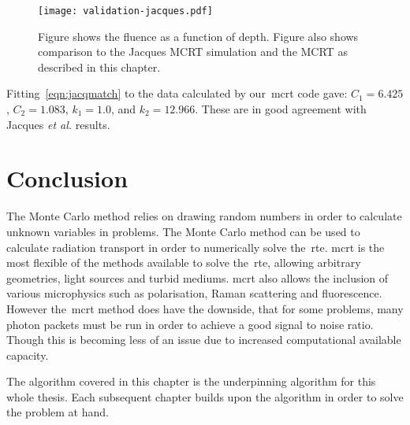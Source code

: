 \begin{figure}[!ht]
	\centering
	\texttt{[image: validation-jacques.pdf]}
	\caption{Figure shows the fluence as a function of depth. Figure also shows comparison to the Jacques MCRT simulation and the MCRT as described in this chapter.}
	\label{fig:matchjacq}
\end{figure}


Fitting~\cref{eqn:jacqmatch} to the data calculated by our~\gls*{mcrt} code gave: $C_1 = 6.425$, $C_2=1.083$, $k_1=1.0$, and $k_2=12.966$.
These are in good agreement with Jacques \textit{et al.} results.

\section{Conclusion}

The Monte Carlo method relies on drawing random numbers in order to calculate unknown variables in problems.
The Monte Carlo method can be used to calculate radiation transport in order to numerically solve the~\gls*{rte}.
\Gls*{mcrt} is the most flexible of the methods available to solve the~\gls*{rte}, allowing arbitrary geometries, light sources and turbid mediums.
\Gls*{mcrt} also allows the inclusion of various microphysics such as polarisation, Raman scattering and fluorescence.
However the~\gls*{mcrt} method does have the downside, that for some problems, many photon packets must be run in order to achieve a good signal to noise ratio.
Though this is becoming less of an issue due to increased computational available capacity.

The algorithm covered in this chapter is the underpinning algorithm for this whole thesis.
Each subsequent chapter builds upon the algorithm in order to solve the problem at hand.


